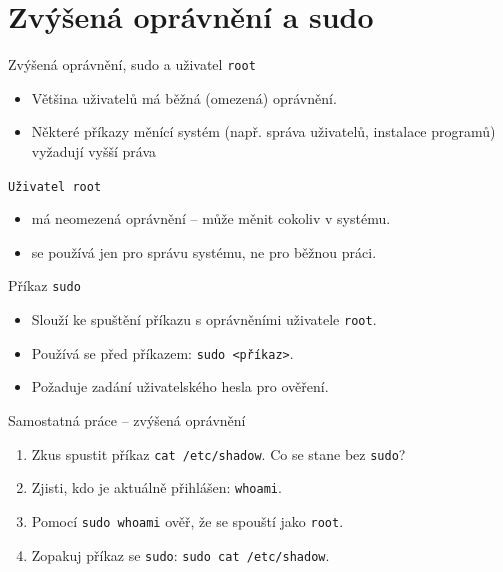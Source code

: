 \documentclass{beamer}
\begin{document}
\section{Zvýšená oprávnění a sudo}
\begin{frame}{Zvýšená oprávnění, sudo a uživatel \texttt{root}}
	\begin{itemize}
		\item Většina uživatelů má běžná (omezená) oprávnění.
		\item Některé příkazy měnící systém (např. správa uživatelů, instalace programů) vyžadují vyšší práva
	\end{itemize}
	
	\begin{block}{\texttt{Uživatel root}}
	\begin{itemize}
			\item má neomezená oprávnění – může měnit cokoliv v systému.
	\item se používá jen pro správu systému, ne pro běžnou práci.
		\end{itemize}
		\end{block}
	\begin{block}{Příkaz \texttt{sudo}}
		\begin{itemize}
			\item Slouží ke spuštění příkazu s oprávněními uživatele \texttt{root}.
			\item Používá se před příkazem: \texttt{sudo <příkaz>}.
			\item Požaduje zadání uživatelského hesla pro ověření.
		\end{itemize}
	\end{block}

\end{frame}

\begin{frame}{Samostatná práce – zvýšená oprávnění}
	\small
	\begin{enumerate}
		\item Zkus spustit příkaz \texttt{cat /etc/shadow}.  
		Co se stane bez \texttt{sudo}?
		\item Zjisti, kdo je aktuálně přihlášen: \texttt{whoami}.
		\item Pomocí \texttt{sudo whoami} ověř, že se spouští jako \texttt{root}.
		\item Zopakuj příkaz se \texttt{sudo}: \texttt{sudo cat /etc/shadow}.
	\end{enumerate}
\end{frame}
\end{document}
